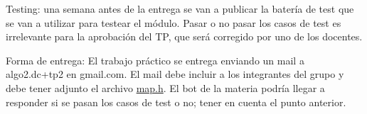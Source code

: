 \begin{DoxyItemize}
\item Testing\-: una semana antes de la entrega se van a publicar la batería de test que se van a utilizar para testear el módulo. Pasar o no pasar los casos de test es irrelevante para la aprobación del T\-P, que será corregido por uno de los docentes.
\item Forma de entrega\-: El trabajo práctico se entrega enviando un mail a {\ttfamily algo2.\-dc+tp2} en {\ttfamily gmail.\-com}. El mail debe incluir a los integrantes del grupo y debe tener adjunto el archivo {\ttfamily \hyperlink{map_8h}{map.\-h}}. El bot de la materia podría llegar a responder si se pasan los casos de test o no; tener en cuenta el punto anterior. 
\end{DoxyItemize}